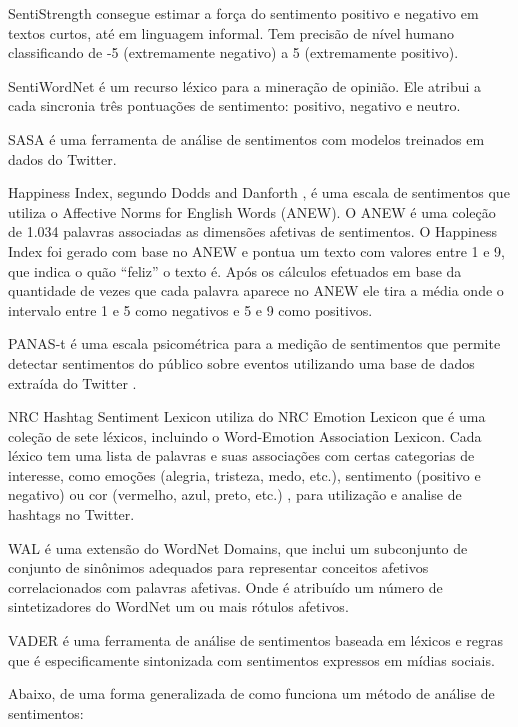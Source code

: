 \documentclass[12pt, a4paper]{article}
\begin{document}
\medskip
SentiStrength consegue estimar a força do sentimento positivo e negativo em textos curtos, até em linguagem informal. Tem precisão de nível humano classificando de -5 (extremamente negativo) a 5 (extremamente positivo).

\medskip
SentiWordNet é um recurso léxico para a mineração de opinião. Ele atribui a cada sincronia três pontuações de sentimento: positivo, negativo e neutro.

\medskip
SASA é uma ferramenta de análise de sentimentos com modelos treinados em dados do Twitter.

\medskip
Happiness Index, segundo Dodds and Danforth \citeyear{Dodds}, é uma escala de sentimentos que utiliza o Affective Norms for English Words (ANEW). O ANEW é uma coleção de 1.034 palavras associadas as dimensões afetivas de sentimentos. O Happiness Index foi gerado com base no ANEW e pontua um texto com valores entre 1 e 9, que indica o quão “feliz” o texto é. Após os cálculos efetuados em base da quantidade de vezes que cada palavra aparece no ANEW ele tira a média onde o intervalo entre 1 e 5 como negativos e 5 e 9 como positivos.

\medskip
PANAS-t é uma escala psicométrica para a medição de sentimentos que permite detectar sentimentos do público sobre eventos utilizando uma base de dados extraída do Twitter \cite{Goncalves}.

\medskip
NRC Hashtag Sentiment Lexicon utiliza do NRC Emotion Lexicon que é uma coleção de sete léxicos, incluindo o Word-Emotion Association Lexicon. Cada léxico tem uma lista de palavras e suas associações com certas categorias de interesse, como emoções (alegria, tristeza, medo, etc.), sentimento (positivo e negativo) ou cor (vermelho, azul, preto, etc.) \cite{nrcc}, para utilização e analise de hashtags no Twitter.

\medskip
WAL é uma extensão do WordNet Domains, que inclui um subconjunto de conjunto de sinônimos adequados para representar conceitos afetivos correlacionados com palavras afetivas. Onde é atribuído um número de sintetizadores do WordNet um ou mais rótulos afetivos.

\medskip
VADER é uma ferramenta de análise de sentimentos baseada em léxicos e regras que é especificamente sintonizada com sentimentos expressos em mídias sociais.

\medskip
Abaixo, de uma forma generalizada de como funciona um método de análise de sentimentos:
\end{document}
